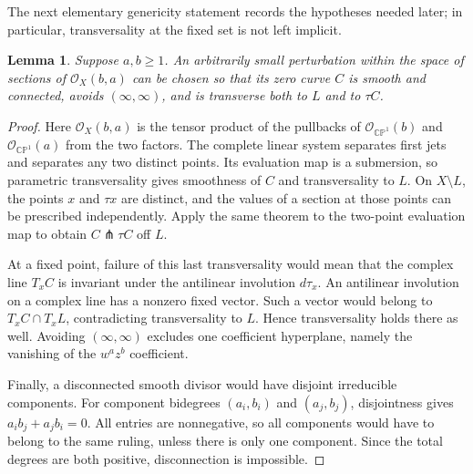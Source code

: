 \documentclass[UTF8,11pt]{ctexart}
\newtheorem{lem}[thm]{Lemma}
\theoremstyle{definition}
\numberwithin{equation}{section}
\newcommand{\CP}{\mathbb {CP}}\newcommand{\cP}{\mathcal P}
\begin{document}
The next elementary genericity statement records the hypotheses needed
later; in particular, transversality at the fixed set is not left implicit.
\begin{lem}\label{b:lem:generic}
Suppose $a,b\ge1$. An arbitrarily small perturbation within the
space of sections of $\mathcal O_X(b,a)$ can be chosen so that its
zero curve $C$ is smooth and connected, avoids $(\infty,\infty)$,
and is transverse both to $L$ and to $\tau C$.
\end{lem}
\begin{proof}
Here $\mathcal O_X(b,a)$ is the tensor product of the pullbacks of
$\mathcal O_{\CP^1}(b)$ and $\mathcal O_{\CP^1}(a)$ from the two factors.
The complete linear system separates first jets and separates any two
distinct points. Its evaluation map is a submersion, so parametric
transversality gives smoothness of $C$ and transversality to $L$.
On $X\setminus L$, the points $x$ and $\tau x$ are distinct, and the
values of a section at those points can be prescribed independently.
Apply the same theorem to the two-point evaluation map to obtain
$C\pitchfork\tau C$ off $L$.

At a fixed point, failure of this last transversality would mean that
the complex line $T_xC$ is invariant under the antilinear involution
$d\tau_x$. An antilinear involution on a complex line has a nonzero
fixed vector. Such a vector would belong to $T_xC\cap T_xL$,
contradicting transversality to $L$. Hence transversality holds there
as well. Avoiding $(\infty,\infty)$ excludes one coefficient
hyperplane, namely the vanishing of the $w^az^b$ coefficient.

Finally, a disconnected smooth divisor would have disjoint irreducible
components. For component bidegrees $(a_i,b_i)$ and $(a_j,b_j)$,
disjointness gives $a_ib_j+a_jb_i=0$. All entries are nonnegative,
so all components would have to belong to the same ruling, unless
there is only one component. Since the total degrees are both
positive, disconnection is impossible.
\end{proof}
\end{document}
